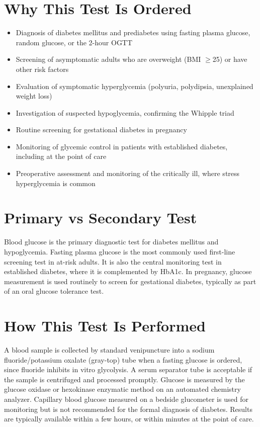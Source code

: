 \section*{Why This Test Is Ordered}
\begin{itemize}
  \item Diagnosis of diabetes mellitus and prediabetes using fasting plasma glucose, random glucose, or the 2-hour OGTT
  \item Screening of asymptomatic adults who are overweight (BMI $\geq$25) or have other risk factors
  \item Evaluation of symptomatic hyperglycemia (polyuria, polydipsia, unexplained weight loss)
  \item Investigation of suspected hypoglycemia, confirming the Whipple triad
  \item Routine screening for gestational diabetes in pregnancy
  \item Monitoring of glycemic control in patients with established diabetes, including at the point of care
  \item Preoperative assessment and monitoring of the critically ill, where stress hyperglycemia is common
\end{itemize}
\section*{Primary vs Secondary Test}
Blood glucose is the primary diagnostic test for diabetes mellitus and hypoglycemia. Fasting plasma glucose is the most commonly used first-line screening test in at-risk adults. It is also the central monitoring test in established diabetes, where it is complemented by HbA1c. In pregnancy, glucose measurement is used routinely to screen for gestational diabetes, typically as part of an oral glucose tolerance test.
\section*{How This Test Is Performed}
A blood sample is collected by standard venipuncture into a sodium fluoride/potassium oxalate (gray-top) tube when a fasting glucose is ordered, since fluoride inhibits in vitro glycolysis. A serum separator tube is acceptable if the sample is centrifuged and processed promptly. Glucose is measured by the glucose oxidase or hexokinase enzymatic method on an automated chemistry analyzer. Capillary blood glucose measured on a bedside glucometer is used for monitoring but is not recommended for the formal diagnosis of diabetes. Results are typically available within a few hours, or within minutes at the point of care.
